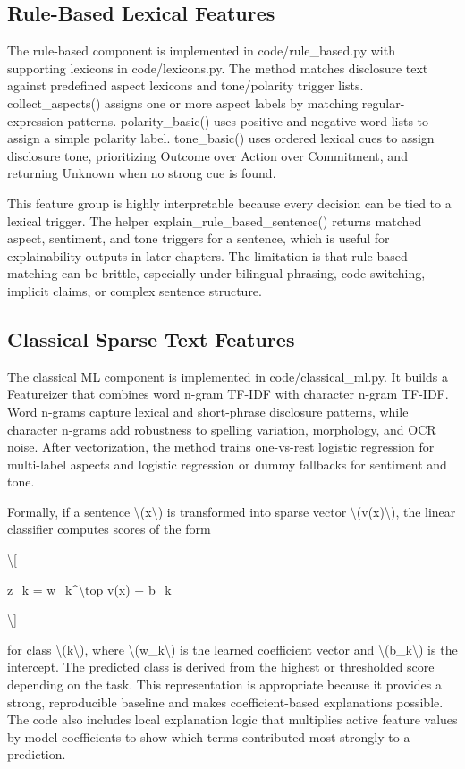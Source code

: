 \subsection{Rule-Based Lexical Features}

The rule-based component is implemented in code/rule\_based.py with supporting lexicons in code/lexicons.py. The method matches disclosure text against predefined aspect lexicons and tone/polarity trigger lists. collect\_aspects() assigns one or more aspect labels by matching regular-expression patterns. polarity\_basic() uses positive and negative word lists to assign a simple polarity label. tone\_basic() uses ordered lexical cues to assign disclosure tone, prioritizing Outcome over Action over Commitment, and returning Unknown when no strong cue is found.

This feature group is highly interpretable because every decision can be tied to a lexical trigger. The helper explain\_rule\_based\_sentence() returns matched aspect, sentiment, and tone triggers for a sentence, which is useful for explainability outputs in later chapters. The limitation is that rule-based matching can be brittle, especially under bilingual phrasing, code-switching, implicit claims, or complex sentence structure.

\subsection{Classical Sparse Text Features}

The classical ML component is implemented in code/classical\_ml.py. It builds a Featureizer that combines word n-gram TF-IDF with character n-gram TF-IDF. Word n-grams capture lexical and short-phrase disclosure patterns, while character n-grams add robustness to spelling variation, morphology, and OCR noise. After vectorization, the method trains one-vs-rest logistic regression for multi-label aspects and logistic regression or dummy fallbacks for sentiment and tone.

Formally, if a sentence \textbackslash{}(x\textbackslash{}) is transformed into sparse vector \textbackslash{}(v(x)\textbackslash{}), the linear classifier computes scores of the form

\textbackslash{}[

z\_k = w\_k\textasciicircum{}\textbackslash{}top v(x) + b\_k

\textbackslash{}]

for class \textbackslash{}(k\textbackslash{}), where \textbackslash{}(w\_k\textbackslash{}) is the learned coefficient vector and \textbackslash{}(b\_k\textbackslash{}) is the intercept. The predicted class is derived from the highest or thresholded score depending on the task. This representation is appropriate because it provides a strong, reproducible baseline and makes coefficient-based explanations possible. The code also includes local explanation logic that multiplies active feature values by model coefficients to show which terms contributed most strongly to a prediction.

